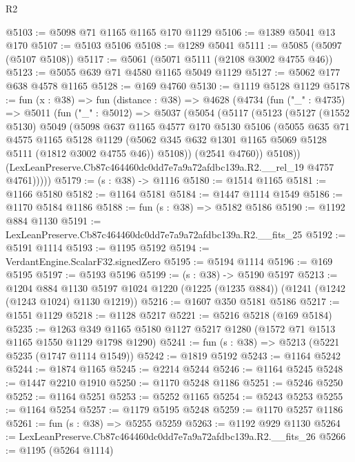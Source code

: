 \begin{lexlean}{R2}
\begin{coremodule}
@5103 := @5098 @71 @1165 @1165 @170 @1129
@5106 := @1389 @5041 @13 @170
@5107 := @5103 @5106
@5108 := @1289 @5041
@5111 := @5085 (@5097 (@5107 @5108))
@5117 := @5061 (@5071 @5111 (@2108 @3002 @4755 @46))
@5123 := @5055 @639 @71 @4580 @1165 @5049 @1129
@5127 := @5062 @177 @638 @4578 @1165
@5128 := @169 @4760
@5130 := @1119 @5128 @1129
@5178 := fun (x : @38) =>
  fun (distance : @38) =>
  @4628
    (@4734
      (fun ("_" : @4735) =>
      @5011
        (fun ("_" : @5012) =>
        @5037
          (@5054
            (@5117
              (@5123
                (@5127
                  (@1552 @5130)
                  @5049
                  (@5098
                    @637
                    @1165
                    @4577
                    @170
                    @5130
                    @5106
                    (@5055
                      @635
                      @71
                      @4575
                      @1165
                      @5128
                      @1129
                      (@5062 @345 @632 @1301 @1165 @5069 @5128 @5111 (@1812 @3002 @4755 @46))
                      @5108))
                  (@2541 @4760))
                @5108))
            (LexLeanPreserve.Cb87c464460dc0dd7e7a9a72afdbc139a.R2.__rel_19 @4757 @4761)))))
@5179 := (s : @38) -> @1116
@5180 := @1514 @1165
@5181 := @1166 @5180
@5182 := @1164 @5181
@5184 := @1447 @1114 @1549
@5186 := @1170 @5184 @1186
@5188 := fun (s : @38) => @5182 @5186
@5190 := @1192 @884 @1130
@5191 := LexLeanPreserve.Cb87c464460dc0dd7e7a9a72afdbc139a.R2.__fits_25
@5192 := @5191 @1114
@5193 := @1195 @5192
@5194 := VerdantEngine.ScalarF32.signedZero
@5195 := @5194 @1114
@5196 := @169 @5195
@5197 := @5193 @5196
@5199 := (s : @38) -> @5190 @5197
@5213 := @1204
    @884
    @1130
    @5197
    @1024
    @1220
    (@1225 (@1235 @884))
    (@1241 (@1242 (@1243 @1024) @1130 @1219))
@5216 := @1607 @350 @5181 @5186
@5217 := @1551 @1129
@5218 := @1128 @5217
@5221 := @5216 @5218 (@169 @5184)
@5235 := @1263 @349 @1165 @5180 @1127 @5217 @1280 (@1572 @71 @1513 @1165 @1550 @1129 @1798 @1290)
@5241 := fun (s : @38) => @5213 (@5221 @5235 (@1747 @1114 @1549))
@5242 := @1819 @5192
@5243 := @1164 @5242
@5244 := @1874 @1165
@5245 := @2214 @5244
@5246 := @1164 @5245
@5248 := @1447 @2210 @1910
@5250 := @1170 @5248 @1186
@5251 := @5246 @5250
@5252 := @1164 @5251
@5253 := @5252 @1165
@5254 := @5243 @5253
@5255 := @1164 @5254
@5257 := @1179 @5195 @5248
@5259 := @1170 @5257 @1186
@5261 := fun (s : @38) => @5255 @5259
@5263 := @1192 @929 @1130
@5264 := LexLeanPreserve.Cb87c464460dc0dd7e7a9a72afdbc139a.R2.__fits_26
@5266 := @1195 (@5264 @1114)

\end{coremodule}
\end{lexlean}
